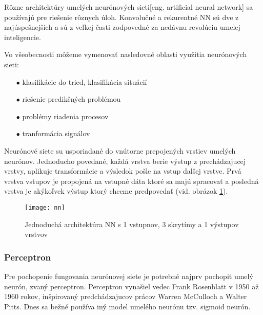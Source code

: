 Rôzne architektúry umelých neurónových sieti[eng. artificial neural network] sa používajú pre riešenie rôznych úloh.
Konvolučné a rekurentné NN sú dve z najúspešnejších a sú z veľkej časti zodpovedné za nedávnu revolúciu umelej inteligencie\cite{odkaz:CorrectionOfImageOrentation}.

Vo všeobecnosti môžeme vymenovať nasledovné oblasti využitia neurónových sieti\cite{odkaz:NNIntroduction}:
\begin{enumerate}
    \item[$\bullet$] klasifikácie do tried, klasifikácia situácií
    \item[$\bullet$] riešenie predikčných problémou
    \item[$\bullet$] problémy riadenia procesov
    \item[$\bullet$] tranformácia signálov
\end{enumerate}

Neurónové siete su usporiadané do vnútorne prepojených vrstiev umelých neurónov.
Jednoducho povedané, každá vrstva berie výstup z prechádzajucej vrstvy, aplikuje transformácie a výsledok pošle na vstup ďalšej vrstve.
Prvá vrstva vstupov je propojená na vstupné dáta ktoré sa majú spracovať a posledná vrstva je akýkoľvek výstup ktorý chceme predpovedať \cite{odkaz:CorrectionOfImageOrentation} (vid. obrázok \ref{pic:NNExample}).
\begin{figure}[H]
	\centering
	\texttt{[image: nn]}
	\caption{Jednoduchá architektúra NN s 1 vstupnov, 3 skrytímy a 1 výstupov vrstvov\cite{odkaz:CorrectionOfImageOrentation}}
	\label{pic:NNExample}
\end{figure}

\subsubsection{Perceptron}
Pre pochopenie fungovania neurónovej siete je potrebné najprv pochopiť umelý neurón, zvaný perceptron.
Perceptron vynašiel vedec Frank Rosenblatt v 1950 až 1960 rokov, inšpirovaný predchádzajucov prácov Warren McCulloch a Walter Pitts.
Dnes sa bežné používa iný model umelého neurónu tzv. sigmoid neurón\cite{odkaz:HandwrittenDigitRecognision}.

